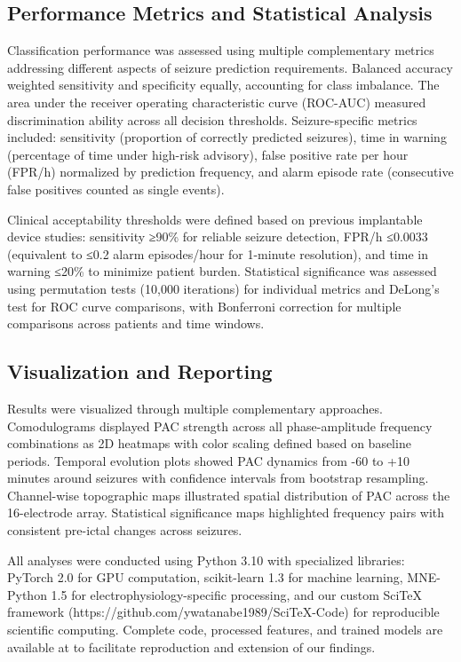 \subsection{Performance Metrics and Statistical Analysis}
Classification performance was assessed using multiple complementary metrics addressing different aspects of seizure prediction requirements. Balanced accuracy weighted sensitivity and specificity equally, accounting for class imbalance. The area under the receiver operating characteristic curve (ROC-AUC) measured discrimination ability across all decision thresholds. Seizure-specific metrics included: sensitivity (proportion of correctly predicted seizures), time in warning (percentage of time under high-risk advisory), false positive rate per hour (FPR/h) normalized by prediction frequency, and alarm episode rate (consecutive false positives counted as single events).

	Clinical acceptability thresholds were defined based on previous implantable device studies: sensitivity ≥90\% for reliable seizure detection, FPR/h ≤0.0033 (equivalent to ≤0.2 alarm episodes/hour for 1-minute resolution), and time in warning ≤20\% to minimize patient burden. Statistical significance was assessed using permutation tests (10,000 iterations) for individual metrics and DeLong's test for ROC curve comparisons, with Bonferroni correction for multiple comparisons across patients and time windows.

\subsection{Visualization and Reporting}
Results were visualized through multiple complementary approaches. Comodulograms displayed PAC strength across all phase-amplitude frequency combinations as 2D heatmaps with color scaling defined based on baseline periods. Temporal evolution plots showed PAC dynamics from -60 to +10 minutes around seizures with confidence intervals from bootstrap resampling. Channel-wise topographic maps illustrated spatial distribution of PAC across the 16-electrode array. Statistical significance maps highlighted frequency pairs with consistent pre-ictal changes across seizures.

	All analyses were conducted using Python 3.10 with specialized libraries: PyTorch 2.0 for GPU computation, scikit-learn 1.3 for machine learning, MNE-Python 1.5 for electrophysiology-specific processing, and our custom SciTeX framework (https://github.com/ywatanabe1989/SciTeX-Code) for reproducible scientific computing. Complete code, processed features, and trained models are available at  to facilitate reproduction and extension of our findings.

\label{sec:methods}

